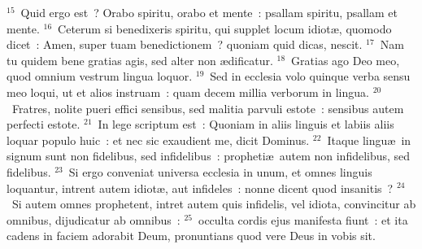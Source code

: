 ${}^{15}$~Quid ergo est~? Orabo spiritu, orabo et mente~: psallam spiritu, psallam et mente.
${}^{16}$~Ceterum si benedixeris spiritu, qui supplet locum idiot\ae , quomodo dicet~: Amen, super tuam benedictionem~? quoniam quid dicas, nescit.
${}^{17}$~Nam tu quidem bene gratias agis, sed alter non \ae dificatur.
${}^{18}$~Gratias ago Deo meo, quod omnium vestrum lingua loquor.
${}^{19}$~Sed in ecclesia volo quinque verba sensu meo loqui, ut et alios instruam~: quam decem millia verborum in lingua.
${}^{20}$~Fratres, nolite pueri effici sensibus, sed malitia parvuli estote~: sensibus autem perfecti estote.
${}^{21}$~In lege scriptum est~: Quoniam in aliis linguis et labiis aliis loquar populo huic~: et nec sic exaudient me, dicit Dominus.
${}^{22}$~Itaque lingu\ae\ in signum sunt non fidelibus, sed infidelibus~: propheti\ae\ autem non infidelibus, sed fidelibus.
${}^{23}$~Si ergo conveniat universa ecclesia in unum, et omnes linguis loquantur, intrent autem idiot\ae , aut infideles~: nonne dicent quod insanitis~?
${}^{24}$~Si autem omnes prophetent, intret autem quis infidelis, vel idiota, convincitur ab omnibus, dijudicatur ab omnibus~:
${}^{25}$~occulta cordis ejus manifesta fiunt~: et ita cadens in faciem adorabit Deum, pronuntians quod vere Deus in vobis sit.


